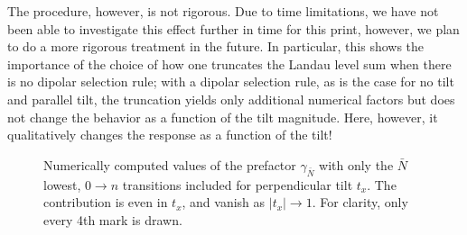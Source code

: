 The procedure, however, is not rigorous.
Due to time limitations, we have not been able to investigate this effect further in time for this print, however, we plan to do a more rigorous treatment in the future.
In particular, this shows the importance of the choice of how one truncates the Landau level sum when there is no dipolar selection rule;
with a dipolar selection rule, as is the case for no tilt and parallel tilt, the truncation yields only additional numerical factors but does not change the behavior as a function of the tilt magnitude.
Here, however, it qualitatively changes the response as a function of the tilt!
\nowidow[3]

\begin{figure}[htb]
  \centering
  \caption{Numerically computed values of the prefactor \( \gamma_{\bar{N}} \) with only the \( \bar{N}\) lowest, \( 0\to n\) transitions included for perpendicular tilt \( t_x \).
    The contribution is even in \( t_x \), and vanish as \( |t_x| \to 1 \).
    For clarity, only every 4th mark is drawn.
    \label{fig:0tontx}
  }
\end{figure}

